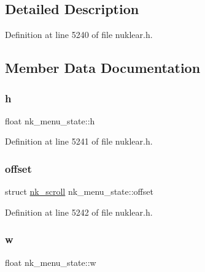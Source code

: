 \subsection{Detailed Description}


Definition at line 5240 of file nuklear.\+h.



\subsection{Member Data Documentation}
\mbox{\label{structnk__menu__state_a9cdc4e270abddf8ca2439344462d000e}} 
\subsubsection{\texorpdfstring{h}{h}}
{\footnotesize\ttfamily float nk\+\_\+menu\+\_\+state\+::h}



Definition at line 5241 of file nuklear.\+h.

\mbox{\label{structnk__menu__state_a5c9dbc6f4874d334884970a3a50a9106}} 
\subsubsection{\texorpdfstring{offset}{offset}}
{\footnotesize\ttfamily struct \mbox{\hyperlink{structnk__scroll}{nk\+\_\+scroll}} nk\+\_\+menu\+\_\+state\+::offset}



Definition at line 5242 of file nuklear.\+h.

\mbox{\label{structnk__menu__state_a03bc0fc57cc730e820c1c3f6b55ae389}} 
\subsubsection{\texorpdfstring{w}{w}}
{\footnotesize\ttfamily float nk\+\_\+menu\+\_\+state\+::w}



